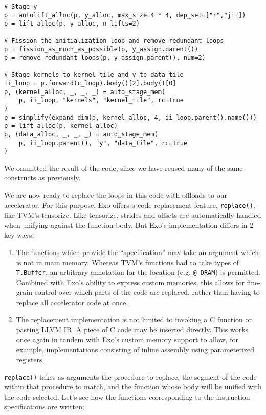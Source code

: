 \documentclass[acmsmall, nonacm=true]{acmart}
\begin{document}
\begin{verbatim}
# Stage y
p = autolift_alloc(p, y_alloc, max_size=4 * 4, dep_set=["r","ji"])
p = lift_alloc(p, y_alloc, n_lifts=2)

# Fission the initialization loop and remove redundant loops
p = fission_as_much_as_possible(p, y_assign.parent())
p = remove_redundant_loops(p, y_assign.parent(), num=2)

# Stage kernels to kernel_tile and y to data_tile
ii_loop = p.forward(c_loop).body()[2].body()[0]
p, (kernel_alloc, _, _, _) = auto_stage_mem(
    p, ii_loop, "kernels", "kernel_tile", rc=True
)
p = simplify(expand_dim(p, kernel_alloc, 4, ii_loop.parent().name()))
p = lift_alloc(p, kernel_alloc)
p, (data_alloc, _, _, _) = auto_stage_mem(
    p, ii_loop.parent(), "y", "data_tile", rc=True
)
\end{verbatim}

We ommitted the result of the code, since we have reused many of the same constructs as previously.

We are now ready to replace the loops in this code with offloads to our accelerator. For this purpose, Exo offers a code replacement feature, \verb|replace()|, like TVM's tensorize. Like tensorize, strides and offsets are automatically handled when unifying against the function body. But Exo's implementation differs in 2 key ways:
\begin{enumerate}
    \item The functions which provide the ``specification'' may take an argument which is not in main memory. Whereas TVM's functions had to take types of \verb|T.Buffer|, an arbitrary annotation for the location (e.g. \verb|@ DRAM|) is permitted. Combined with Exo's ability to express custom memories, this allows for fine-grain control over which parts of the code are replaced, rather than having to replace all accelerator code at once. 
    \item The replacement implementation is not limited to invoking a C function or pasting LLVM IR. A piece of C code may be inserted directly. This works once again in tandem with Exo's custom memory support to allow, for example, implementations consisting of inline assembly using parameterized registers. 
\end{enumerate}

\verb|replace()| takes as arguments the procedure to replace, the segment of the code within that procedure to match, and the function whose body will be unified with the code selected. Let's see how the functions corresponding to the instruction specifications are written:
\end{document}
